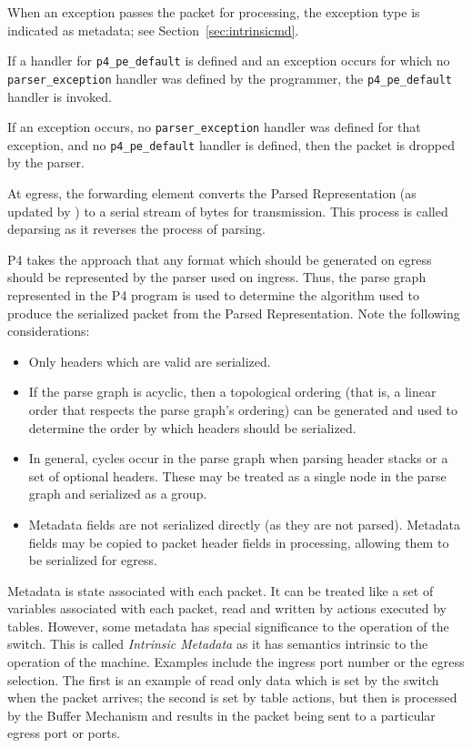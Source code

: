 \documentclass[12pt]{article}
\begin{document}
When an exception passes the packet for \matchaction processing, the exception 
type is indicated as metadata; see Section~\ref{sec:intrinsicmd}.


If a handler for \texttt{p4_pe_default} is defined and an exception occurs for which 
no \\
\texttt{parser_exception} handler was defined by the programmer, the \texttt{p4_pe_default} handler 
is invoked. 

If an exception occurs, no \texttt{parser_exception} handler was defined for that 
exception, and no \texttt{p4_pe_default} handler is defined, then the packet is 
dropped by the parser. 


At egress, the forwarding element converts the Parsed Representation (as updated 
by \matchaction) to a serial stream of bytes for transmission. This process 
is called deparsing as it reverses the process of parsing.

P4 takes the approach that any format which should be generated on egress 
should be represented by the parser used on ingress.  Thus, the parse graph 
represented in the P4 program is used to determine the algorithm used to produce 
the serialized packet from the Parsed Representation.  Note the following 
considerations:

\begin{itemize}
\item
Only headers which are valid are serialized.
\item
If the parse graph is acyclic, then a topological ordering (that is, a linear 
order that respects the parse graph's ordering) can be generated and used 
to determine the order by which headers should be serialized.
\item
In general, cycles occur in the parse graph when parsing header stacks or 
a set of optional headers.  These may be treated as a single node in the parse 
graph and serialized as a group. 
\item
Metadata fields are not serialized directly (as they are not parsed).  Metadata 
fields may be copied to packet header fields in \matchaction processing, allowing 
them to be serialized for egress.
\end{itemize}



Metadata is state associated with each packet. It can be treated like a set 
of variables associated with each packet, read and written by actions executed 
by tables. However, some metadata has special significance to the operation 
of the switch. This is called \textit{Intrinsic Metadata} as it has semantics intrinsic 
to the operation of the machine. Examples include the ingress port number 
or the egress selection. The first is an example of read only data which is 
set by the switch when the packet arrives; the second is set by table actions, 
but then is processed by the Buffer Mechanism and results in the packet being 
sent to a particular egress port or ports.
\end{document}
